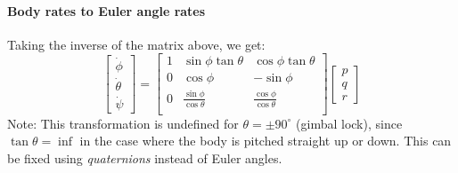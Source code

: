 \documentclass[a4paper,12pt]{article}
\begin{document}
\paragraph{Body rates to Euler angle rates}

Taking the inverse of the matrix above, we get:
\begin{equation} \nonumber
    \begin{bmatrix}
        \dot{\phi} \\
        \dot{\theta} \\
        \dot{\psi}
    \end{bmatrix} =
    \begin{bmatrix}
        1 & \sin\phi\tan\theta & \cos\phi\tan\theta \\
        0 & \cos\phi & -\sin\phi \\
        0 & \frac{\sin\phi}{\cos\theta} & \frac{\cos\phi}{\cos\theta} \\
    \end{bmatrix}
    \begin{bmatrix}
        p \\ q \\ r
    \end{bmatrix}
\end{equation}
Note: This transformation is undefined for \( \theta = \pm 90^\circ \) (gimbal lock), since \(\tan\theta=\inf\) in the case where the body is pitched straight up or down. This can be fixed using \textit{quaternions} instead of Euler angles.
\end{document}

